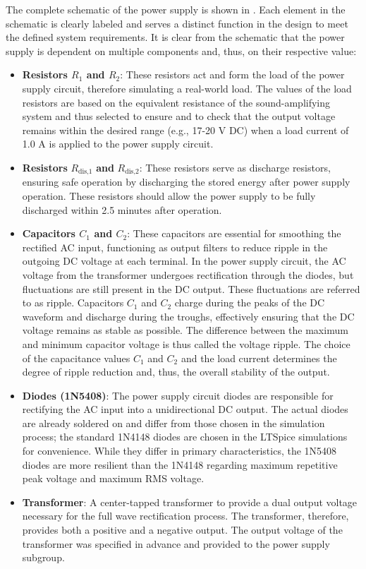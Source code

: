 The complete schematic of the power supply is shown in . Each element in the schematic is clearly labeled and serves a distinct function in the design to meet the defined system requirements.
It is clear from the schematic that the power supply is dependent on multiple components and, thus, on their respective value:
\begin{itemize}
    \item \textbf{Resistors $R_{1}$ and $R_{2}$}: These resistors act and form the load of the power supply circuit, therefore simulating a real-world load. The values of the load resistors are based on the equivalent resistance of the sound-amplifying system and thus selected to ensure and to check that the output voltage remains within the desired range (e.g., 17-20 V DC) when a load current of 1.0 A is applied to the power supply circuit.
    
    \item {\textbf{Resistors} $R_{\text{dis,1}}$ \textbf{and} $R_{\text{dis,2}}$}: These resistors serve as discharge resistors, ensuring safe operation by discharging the stored energy after power supply operation. These resistors should allow the power supply to be fully discharged within 2.5 minutes after operation.
    
    \item \textbf{Capacitors $C_{1}$ and $C_{2}$}: These capacitors are essential for smoothing the rectified AC input, functioning as output filters to reduce ripple in the outgoing DC voltage at each terminal. In the power supply circuit, the AC voltage from the transformer undergoes rectification through the diodes, but fluctuations are still present in the DC output. These fluctuations are referred to as ripple. Capacitors $C_{1}$ and $C_{2}$ charge during the peaks of the DC waveform and discharge during the troughs, effectively ensuring that the DC voltage remains as stable as possible. The difference between the maximum and minimum capacitor voltage is thus called the voltage ripple. The choice of the capacitance values $C_{1}$ and $C_{2}$ and the load current determines the degree of ripple reduction and, thus, the overall stability of the output.
    
    \item \textbf{Diodes (1N5408)}: The power supply circuit diodes are responsible for rectifying the AC input into a unidirectional DC output. The actual diodes are already soldered on and differ from those chosen in the simulation process; the standard 1N4148 diodes are chosen in the LTSpice simulations for convenience.
    While they differ in primary characteristics, the 1N5408 diodes are more resilient than the 1N4148 regarding maximum repetitive peak voltage and maximum RMS voltage.
    \item \textbf{Transformer}: A center-tapped transformer to provide a dual output voltage necessary for the full wave rectification process. The transformer, therefore, provides both a positive and a negative output. The output voltage of the transformer was specified in advance and provided to the power supply subgroup.
\end{itemize}

